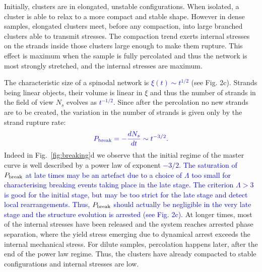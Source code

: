\documentclass[preprint,footinbib,amsmath,amssymb,superscriptaddress]{revtex4}
\begin{document}
Initially, clusters are in elongated, unstable configurations. When isolated, a cluster is able to relax to a more compact and stable shape. However in dense samples, elongated clusters meet, before any compaction, into large branched clusters able to transmit stresses. The compaction trend exerts internal stresses on the strands inside those clusters large enough to make them rupture. This effect is maximum when the sample is fully percolated and thus the network is most strongly stretched, and the internal stresses are maximum.

The characteristic size of a spinodal network is \textcolor{blue}{$\xi(t)\sim t^{1/2}$} (see Fig. 2c). Strands being linear objects, their volume is linear in $\xi$ and thus the number of strands in the field of view $N_s$ evolves as \textcolor{blue}{$t^{-1/2}$}. Since after the percolation no new strands are to be created, the variation in the number of strands is given only by the strand rupture rate:
\begin{equation}
\textcolor{blue}{P_\text{break} = -\frac{d N_s}{dt} \sim t^{-3/2}.}
\end{equation}
Indeed in Fig.~\ref{fig:breaking}d we observe that the initial regime of the master curve is well described by a power law of exponent \textcolor{blue}{$-3/2$}. 
\textcolor{blue}{The saturation of $P_{\rm break}$ at late times may be an artefact due to a choice of $\Lambda$ too small for characterising breaking events taking place in the late stage. 
The criterion $\Lambda>3$ is good for the initial stage, but may be too strict for the late stage and detect local rearrangements. 
Thus, $P_{\rm break}$ should actually be negligible in the very late stage and the structure evolution is arrested (see Fig. 2c).} 
At longer times, most of the internal stresses have been released and the system reaches arrested phase separation, where the yield stress emerging due to dynamical arrest 
exceeds the internal mechanical stress. 
For dilute samples, percolation happens later, after the end of the power law regime. Thus, the clusters have already compacted to stable configurations and internal stresses are low.
\end{document}
